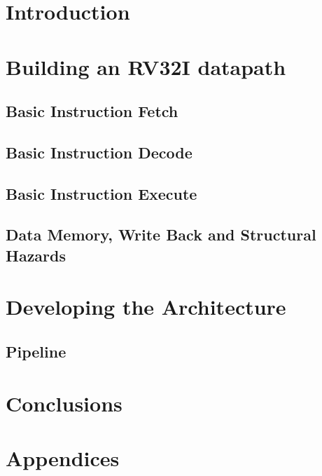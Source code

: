 \documentclass[a4paper]{book}
\begin{document}
\frontmatter
\maketitle

\tableofcontents

\let\cleardoublepage\clearpage
\mainmatter
\chapter{Introduction}


\chapter{Building an RV32I datapath}
\section{Basic Instruction Fetch}


\section{Basic Instruction Decode}


\section{Basic Instruction Execute}


\section{Data Memory, Write Back and Structural Hazards}


\chapter{Developing the Architecture}

\section{Pipeline}




\chapter{Conclusions}


\chapter{Appendices}

 


\let\cleardoublepage\clearpage
\end{document}
